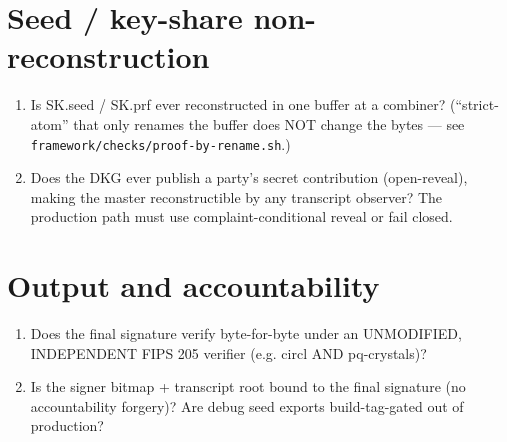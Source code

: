 \documentclass[11pt]{article}
\begin{document}
\section{Seed / key-share non-reconstruction}
\begin{enumerate}[leftmargin=*]
  \item Is SK.seed / SK.prf ever reconstructed in one buffer at a combiner?
    (``strict-atom'' that only renames the buffer does NOT change the bytes ---
    see \texttt{framework/checks/proof-by-rename.sh}.)
  \item Does the DKG ever publish a party's secret contribution (open-reveal),
    making the master reconstructible by any transcript observer? The
    production path must use complaint-conditional reveal or fail closed.
\end{enumerate}

\section{Output and accountability}
\begin{enumerate}[leftmargin=*]
  \item Does the final signature verify byte-for-byte under an UNMODIFIED,
    INDEPENDENT FIPS 205 verifier (e.g. circl AND pq-crystals)?
  \item Is the signer bitmap + transcript root bound to the final signature
    (no accountability forgery)? Are debug seed exports build-tag-gated out of
    production?
\end{enumerate}
\end{document}
